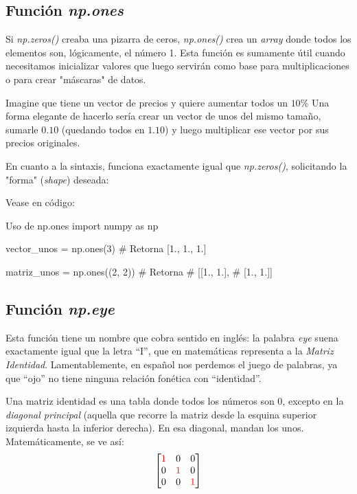 \subsection{Función \textit{np.ones}}

Si \textit{np.zeros()} creaba una pizarra de ceros, \textit{np.ones()} crea un \textit{array} donde todos los elementos son, lógicamente, el número 1. Esta función es sumamente útil cuando necesitamos inicializar valores que luego servirán como base para multiplicaciones o para crear "máscaras" de datos.

\begin{ejemplo}
    Imagine que tiene un vector de precios y quiere aumentar todos un \(10\%\) Una forma elegante de hacerlo sería crear un vector de unos del mismo tamaño, sumarle \(0.10\) (quedando todos en \(1.10\)) y luego multiplicar ese vector por sus precios originales.
\end{ejemplo}

En cuanto a la sintaxis, funciona exactamente igual que \textit{np.zeros()}, solicitando la "forma" (\textit{shape}) deseada:

Vease en código:

\begin{pycode}{Uso de np.ones}
import numpy as np

vector_unos = np.ones(3) # Retorna [1., 1., 1.]

matriz_unos = np.ones((2, 2))
# Retorna
# [[1., 1.],
# [1., 1.]]

\end{pycode}

\subsection{Función \textit{np.eye}}

Esta función tiene un nombre que cobra sentido en inglés: la palabra \textit{eye} suena exactamente igual que la letra ``I'', que en matemáticas representa a la \textit{Matriz Identidad}. Lamentablemente, en español nos perdemos el juego de palabras, ya que ``ojo'' no tiene ninguna relación fonética con ``identidad''.

Una matriz identidad es una tabla donde todos los números son \(0\), excepto en la \textit{diagonal principal} (aquella que recorre la matriz desde la esquina superior izquierda hasta la inferior derecha). En esa diagonal, mandan los unos. Matemáticamente, se ve así:
\[
\begin{bmatrix}
    {\color{red}1} & 0 & 0 \\
    0 & {\color{red}1} & 0 \\
    0 & 0 & {\color{red}1}
\end{bmatrix}
\]

